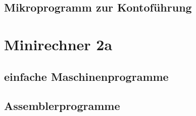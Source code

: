\documentclass[paper=a4, fontsize=11pt]{scrartcl}
\numberwithin{equation}{section}
\numberwithin{figure}{section}
\numberwithin{table}{section}
\begin{document}
\subsection{Mikroprogramm zur Kontoführung}


\newpage

\section{Minirechner 2a}

\subsection{einfache Maschinenprogramme}

\subsection{Assemblerprogramme}
\end{document}
